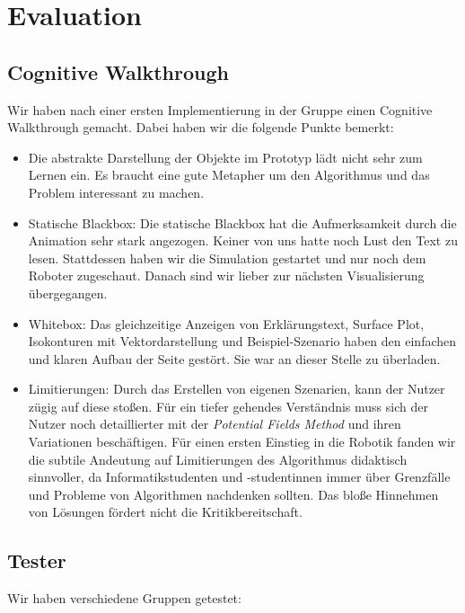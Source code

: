 \section{Evaluation}


\subsection{Cognitive Walkthrough}\label{sec:cogWal}
Wir haben nach einer ersten Implementierung in der Gruppe einen Cognitive Walkthrough gemacht. Dabei haben wir die folgende Punkte bemerkt:
\begin{itemize}
	\item Die abstrakte Darstellung der Objekte im Prototyp lädt nicht sehr zum Lernen ein. Es braucht eine gute Metapher um den Algorithmus und das Problem interessant zu machen.
	\item Statische Blackbox: Die statische Blackbox hat die Aufmerksamkeit durch die Animation sehr stark angezogen. Keiner von uns hatte noch Lust den Text zu lesen. Stattdessen haben wir die Simulation gestartet und nur noch dem Roboter zugeschaut. Danach sind wir lieber zur nächsten Visualisierung übergegangen.
	\item Whitebox: Das gleichzeitige Anzeigen von Erklärungstext, Surface Plot, Isokonturen mit Vektordarstellung und Beispiel-Szenario haben den einfachen und klaren Aufbau der Seite gestört. Sie war an dieser Stelle zu überladen.
	\item Limitierungen: Durch das Erstellen von eigenen Szenarien, kann der Nutzer zügig auf diese stoßen. Für ein tiefer gehendes Verständnis muss sich der Nutzer noch detaillierter mit der \textit{Potential Fields Method} und ihren Variationen beschäftigen. Für einen ersten Einstieg in die Robotik fanden wir die subtile Andeutung auf Limitierungen des Algorithmus didaktisch sinnvoller, da Informatikstudenten und -studentinnen immer über Grenzfälle und Probleme von Algorithmen nachdenken sollten. Das bloße Hinnehmen von Lösungen fördert nicht die Kritikbereitschaft.
\end{itemize}

\subsection{Tester}

Wir haben verschiedene Gruppen getestet:

